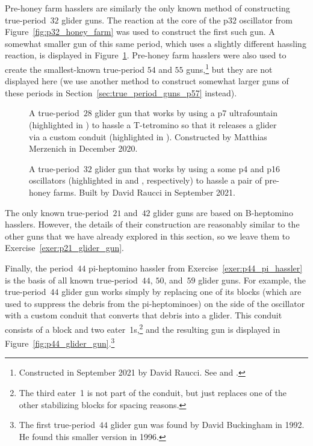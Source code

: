 Pre-honey farm hasslers are similarly the only known method of constructing true-period~$32$ glider guns. The reaction at the core of the p$32$ oscillator from Figure~\ref{fig:p32_honey_farm} was used to construct the first such gun. A somewhat smaller gun of this same period, which uses a slightly different hassling reaction, is displayed in Figure~\ref{fig:p32_glider_gun}. Pre-honey farm hasslers were also used to create the smallest-known true-period $54$ and $55$ guns,\footnote{Constructed in September 2021 by David Raucci. See  and .} but they are not displayed here (we use another method to construct somewhat larger guns of these periods in Section~\ref{sec:true_period_guns_p57} instead).

\begin{figure}[!htb]
	\centering
	\begin{minipage}[t]{.575\textwidth}
		\centering
		\caption{A true-period~$28$ glider gun that works by using a p7 ultrafountain (highlighted in ) to hassle a T-tetromino so that it releases a glider via a custom conduit (highlighted in ). Constructed by Matthias Merzenich in December 2020.}\label{fig:p28_glider_gun}
	\end{minipage} \hfill %
	\begin{minipage}[t]{.395\textwidth}
		\centering
		\caption{A true-period~$32$ glider gun that works by using a some p4 and p16 oscillators (highlighted in  and , respectively) to hassle a pair of pre-honey farms. Built by David Raucci in September 2021.}\label{fig:p32_glider_gun}
	\end{minipage}
\end{figure}

The only known true-period~$21$ and~$42$ glider guns are based on B-heptomino hasslers. However, the details of their construction are reasonably similar to the other guns that we have already explored in this section, so we leave them to Exercise~\ref{exer:p21_glider_gun}.

Finally, the period~$44$ pi-heptomino hassler from Exercise~\ref{exer:p44_pi_hassler} is the basis of all known true-period~$44$, $50$, and~$59$ glider guns. For example, the true-period~$44$ glider gun works simply by replacing one of its blocks (which are used to suppress the debris from the pi-heptominoes) on the side of the oscillator with a custom conduit that converts that debris into a glider. This conduit consists of a block and two eater~1s,\footnote{The third eater~1 is not part of the conduit, but just replaces one of the other stabilizing blocks for spacing reasons.} and the resulting gun is displayed in Figure~\ref{fig:p44_glider_gun}.\footnote{The first true-period~$44$ glider gun was found by David Buckingham in 1992. He found this smaller version in 1996.}


